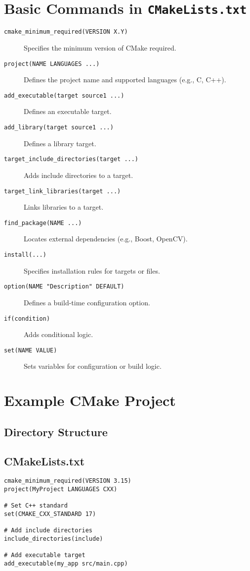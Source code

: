 \section{Basic Commands in \texttt{CMakeLists.txt}}
\begin{description}
    \item[\texttt{cmake\_minimum\_required(VERSION X.Y)}] Specifies the minimum version of CMake required.
    \item[\texttt{project(NAME LANGUAGES ...)}] Defines the project name and supported languages (e.g., C, C++).
    \item[\texttt{add\_executable(target source1 ...)}] Defines an executable target.
    \item[\texttt{add\_library(target source1 ...)}] Defines a library target.
    \item[\texttt{target\_include\_directories(target ...)}] Adds include directories to a target.
    \item[\texttt{target\_link\_libraries(target ...)}] Links libraries to a target.
    \item[\texttt{find\_package(NAME ...)}] Locates external dependencies (e.g., Boost, OpenCV).
    \item[\texttt{install(...)}] Specifies installation rules for targets or files.
    \item[\texttt{option(NAME "Description" DEFAULT)}] Defines a build-time configuration option.
    \item[\texttt{if(condition)}] Adds conditional logic.
    \item[\texttt{set(NAME VALUE)}] Sets variables for configuration or build logic.
\end{description}

\section{Example CMake Project}
\subsection{Directory Structure}

\subsection{CMakeLists.txt}
\begin{verbatim}
cmake_minimum_required(VERSION 3.15)
project(MyProject LANGUAGES CXX)

# Set C++ standard
set(CMAKE_CXX_STANDARD 17)

# Add include directories
include_directories(include)

# Add executable target
add_executable(my_app src/main.cpp)
\end{verbatim}

